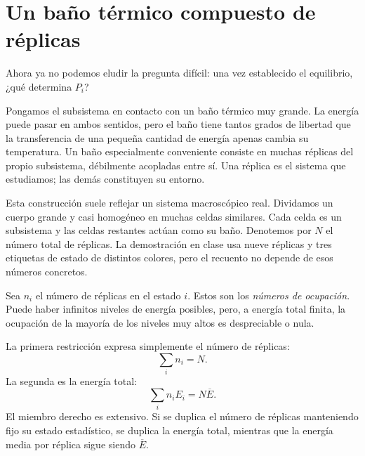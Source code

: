 \section{Un baño térmico compuesto de réplicas}

Ahora ya no podemos eludir la pregunta difícil: una vez establecido el equilibrio, ¿qué determina \(P_i\)?

Pongamos el subsistema en contacto con un baño térmico muy grande. La energía puede pasar en ambos sentidos, pero el baño tiene tantos grados de libertad que la transferencia de una pequeña cantidad de energía apenas cambia su temperatura. Un baño especialmente conveniente consiste en muchas réplicas del propio subsistema, débilmente acopladas entre sí. Una réplica es el sistema que estudiamos; las demás constituyen su entorno.

Esta construcción suele reflejar un sistema macroscópico real. Dividamos un cuerpo grande y casi homogéneo en muchas celdas similares. Cada celda es un subsistema y las celdas restantes actúan como su baño. Denotemos por \(N\) el número total de réplicas. La demostración en clase usa nueve réplicas y tres etiquetas de estado de distintos colores, pero el recuento no depende de esos números concretos.

Sea \(n_i\) el número de réplicas en el estado \(i\). Estos son los \emph{números de ocupación}. Puede haber infinitos niveles de energía posibles, pero, a energía total finita, la ocupación de la mayoría de los niveles muy altos es despreciable o nula.

La primera restricción expresa simplemente el número de réplicas:
\begin{equation}
 \sum_i n_i=N.
 \label{eq:sm3-number-constraint}
\end{equation}
La segunda es la energía total:
\begin{equation}
 \sum_i n_iE_i=N\overline E.
 \label{eq:sm3-total-energy-constraint}
\end{equation}
El miembro derecho es extensivo. Si se duplica el número de réplicas manteniendo fijo su estado estadístico, se duplica la energía total, mientras que la energía media por réplica sigue siendo \(\overline E\).

\begin{classroomqa}
\end{classroomqa}


